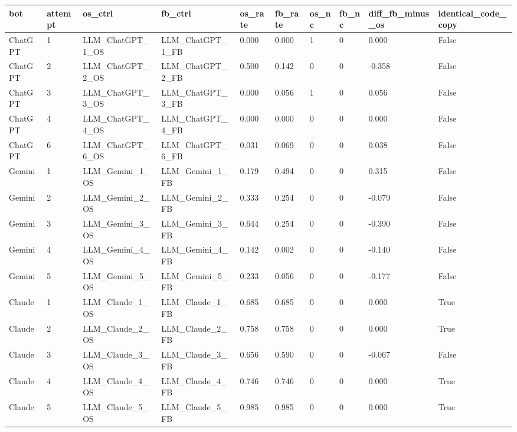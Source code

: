 \begin{tabular}{llllllllll}
\hline
bot & attempt & os\_ctrl & fb\_ctrl & os\_rate & fb\_rate & os\_nc & fb\_nc & diff\_fb\_minus\_os & identical\_code\_copy \\
\hline
ChatGPT & 1 & LLM\_ChatGPT\_1\_OS & LLM\_ChatGPT\_1\_FB & 0.000 & 0.000 & 1 & 0 & 0.000 & False \\
ChatGPT & 2 & LLM\_ChatGPT\_2\_OS & LLM\_ChatGPT\_2\_FB & 0.500 & 0.142 & 0 & 0 & -0.358 & False \\
ChatGPT & 3 & LLM\_ChatGPT\_3\_OS & LLM\_ChatGPT\_3\_FB & 0.000 & 0.056 & 1 & 0 & 0.056 & False \\
ChatGPT & 4 & LLM\_ChatGPT\_4\_OS & LLM\_ChatGPT\_4\_FB & 0.000 & 0.000 & 0 & 0 & 0.000 & False \\
ChatGPT & 6 & LLM\_ChatGPT\_6\_OS & LLM\_ChatGPT\_6\_FB & 0.031 & 0.069 & 0 & 0 & 0.038 & False \\
Gemini & 1 & LLM\_Gemini\_1\_OS & LLM\_Gemini\_1\_FB & 0.179 & 0.494 & 0 & 0 & 0.315 & False \\
Gemini & 2 & LLM\_Gemini\_2\_OS & LLM\_Gemini\_2\_FB & 0.333 & 0.254 & 0 & 0 & -0.079 & False \\
Gemini & 3 & LLM\_Gemini\_3\_OS & LLM\_Gemini\_3\_FB & 0.644 & 0.254 & 0 & 0 & -0.390 & False \\
Gemini & 4 & LLM\_Gemini\_4\_OS & LLM\_Gemini\_4\_FB & 0.142 & 0.002 & 0 & 0 & -0.140 & False \\
Gemini & 5 & LLM\_Gemini\_5\_OS & LLM\_Gemini\_5\_FB & 0.233 & 0.056 & 0 & 0 & -0.177 & False \\
Claude & 1 & LLM\_Claude\_1\_OS & LLM\_Claude\_1\_FB & 0.685 & 0.685 & 0 & 0 & 0.000 & True \\
Claude & 2 & LLM\_Claude\_2\_OS & LLM\_Claude\_2\_FB & 0.758 & 0.758 & 0 & 0 & 0.000 & True \\
Claude & 3 & LLM\_Claude\_3\_OS & LLM\_Claude\_3\_FB & 0.656 & 0.590 & 0 & 0 & -0.067 & False \\
Claude & 4 & LLM\_Claude\_4\_OS & LLM\_Claude\_4\_FB & 0.746 & 0.746 & 0 & 0 & 0.000 & True \\
Claude & 5 & LLM\_Claude\_5\_OS & LLM\_Claude\_5\_FB & 0.985 & 0.985 & 0 & 0 & 0.000 & True \\
\hline
\end{tabular}

